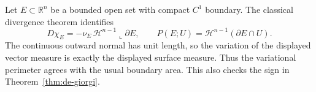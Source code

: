 \begin{example}\label{ex:smooth-perimeter}
Let $E\subset\mathbb{R}^n$ be a bounded open set with compact $C^1$ boundary. The classical divergence theorem identifies
\[
 D\chi_E=-\nu_E\,\mathcal{H}^{n-1}\llcorner\partial E,
 \qquad P(E;U)=\mathcal{H}^{n-1}(\partial E\cap U).
\]
The continuous outward normal has unit length, so the variation of the displayed vector measure is exactly the displayed surface measure. Thus the variational perimeter agrees with the usual boundary area. This also checks the sign in Theorem~\ref{thm:de-giorgi}.
\end{example}
